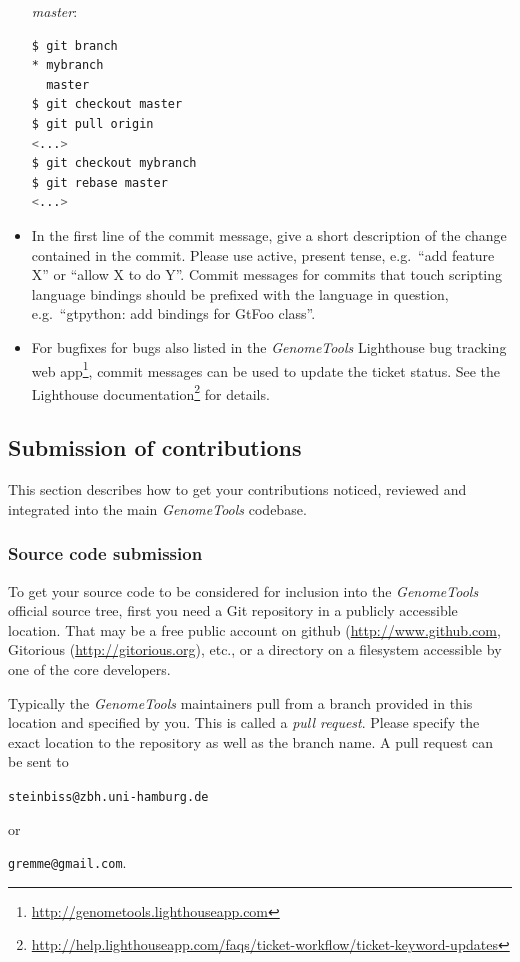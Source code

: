 \documentclass[11pt,final]{article}
\newcommand{\Gt}[0]{\emph{GenomeTools}\xspace}
\begin{document}
\begin{itemize}
\emph{master}:
    \begin{lstlisting}[language=sh]
$ git branch
* mybranch
  master
$ git checkout master
$ git pull origin
<...>
$ git checkout mybranch
$ git rebase master
<...>
    \end{lstlisting}%
\item
In the first line of the commit message, give a short description of the
change contained in the commit.  Please use active, present tense,
e.g.\ ``add feature X'' or ``allow X to do Y''.
Commit messages for commits that touch scripting
language bindings should be prefixed with the language in question,
e.g.\ ``gtpython: add bindings for GtFoo class''.
\item
For bugfixes for bugs also listed in the \Gt Lighthouse bug tracking web
app\footnote{\url{http://genometools.lighthouseapp.com}}, commit messages can
be used to update the ticket status. See the Lighthouse
documentation\footnote{\url{http://help.lighthouseapp.com/faqs/ticket-workflow/ticket-keyword-updates}}
for details.
\end{itemize}

\subsection{Submission of contributions}

This section describes how to get your contributions noticed, reviewed and
integrated into the main \Gt codebase.

\subsubsection{Source code submission}

To get your source code to be considered for inclusion into the \Gt official
source tree, first you need a Git repository in a publicly accessible location.
That may be a free public account on github (\url{http://www.github.com},
Gitorious (\url{http://gitorious.org}), etc., or a directory on a filesystem
accessible by one of the core developers.

Typically the \Gt maintainers pull from a branch provided in this location and
specified by you. This is called a \emph{pull request}. Please specify the exact
location to the repository as well as the branch name. A pull request can be
sent to

\centerline{\texttt{steinbiss@zbh.uni-hamburg.de}}

or

\centerline{\texttt{gremme@gmail.com}.}
\end{document}
